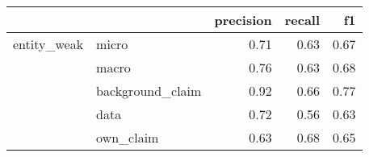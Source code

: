 \begin{tabular}{llrrr}
\toprule
            &           &  precision &  recall &   f1 \\
\midrule
entity\_weak & micro &       0.71 &    0.63 & 0.67 \\
            & macro &       0.76 &    0.63 & 0.68 \\
            & background\_claim &       0.92 &    0.66 & 0.77 \\
            & data &       0.72 &    0.56 & 0.63 \\
            & own\_claim &       0.63 &    0.68 & 0.65 \\
\bottomrule
\end{tabular}
